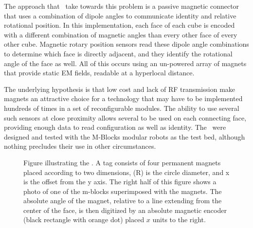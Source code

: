 The approach that \tagNamePlural~take towards this problem is a passive magnetic connector that uses a combination of dipole angles to communicate identity and relative rotational position. In this implementation, each face of each cube is encoded with a different combination of magnetic angles than every other face of every other cube. Magnetic rotary position sensors read these dipole angle combinations to determine which face is directly adjacent, and they identify the rotational angle of the face as well. All of this occurs using an un-powered array of magnets that provide static EM fields, readable at a hyperlocal distance.

The underlying hypothesis is that low cost and lack of RF transmission make magnets an attractive choice for a technology that may have to be implemented hundreds of times in a set of reconfigurable modules. The ability to use several such sensors at close proximity allows several to be used on each connecting face, providing enough data to read configuration as well as identity. The \tagNamePlural~were designed and tested with the M-Blocks modular robots as the test bed, although nothing precludes their use in other circumstances.

\begin{figure*}[th]
	
	
	
	\caption{Figure illustrating the \TagNamePlural. A tag consists of four permanent magnets placed according to two dimensions, (R) is the circle diameter, and x is the offset from the y axis. The right half of this figure shows a photo of one of the m-blocks superimposed with the magnets. The absolute angle of the magnet, relative to a line extending from the center of the face, is then digitized by an absolute magnetic encoder (black rectangle with orange dot) placed $x$ units to the right. }
	\label{fig:tagDiagram}
\end{figure*}

